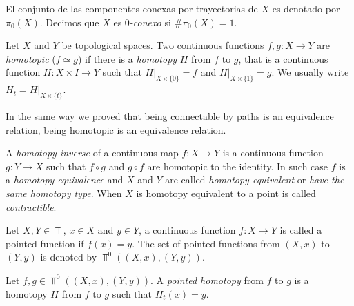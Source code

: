 \documentclass{standalone}
\begin{document}
	\begin{definition}\label{defn:0_connected}
		El conjunto de las componentes conexas por trayectorias de $X$ es denotado por $\pi_{0}(X)$. Decimos que $X$ es \emph{$0$-conexo} si $\#\pi_{0}(X)=1$.
	\end{definition}
	
	
	\begin{definition}\label{defn:homotopy}
		Let $X$ and $Y$ be topological spaces. Two continuous functions $f,g\colon X\rightarrow Y$ are \emph{homotopic} ($f\simeq g$) if there is a \emph{homotopy} $H$ from $f$ to $g$, that is a continuous function $H\colon X\times I\rightarrow Y$ such that $H|_{X\times\{0\}}=f$ and $H|_{X\times\{1\}}=g$. We usually write $H_{t}=H|_{X\times\{t\}}$.
	\end{definition}
	
	\begin{remark}\label{rem:homotopy_rel_equiv}
		In the same way we proved that being connectable by paths is an equivalence relation, being homotopic is an equivalence relation.
	\end{remark}
	
	\begin{definition}\label{defn:homotopy_equivalence}
		A \emph{homotopy inverse} of a continuous map $f:X\rightarrow Y$ is a continuous function $g:Y\rightarrow X$ such that $f\circ g$ and $g\circ f$ are homotopic to the identity. In such case $f$ is a \emph{homotopy equivalence} and $X$ and $Y$ are called \emph{homotopy equivalent} or \emph{have the same homotopy type}. When $X$ is homotopy equivalent to a point is called \emph{contractible}.
	\end{definition}
	
	Let $X,Y\in\Top$, $x\in X$ and $y\in Y$, a continuous function $f\colon X\rightarrow Y$ is called a pointed function if $f(x)=y$. The set of pointed functions from $(X,x)$ to $(Y,y)$ is denoted by $\Top^{0}((X,x),(Y,y))$.
	
	\begin{definition}\label{def:rel_homotopy}
		Let $f,g\in\Top^{0}((X,x),(Y,y))$. A \emph{pointed homotopy} from $f$ to $g$ is a homotopy $H$ from $f$ to $g$ such that $H_{t}(x)=y$. 
	\end{definition}
	
\end{document}
